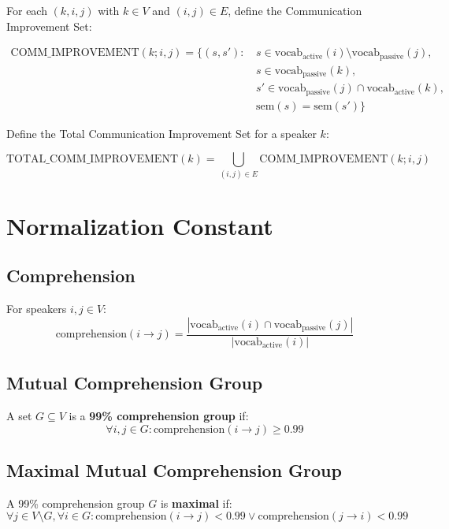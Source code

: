 \documentclass[11pt,a4paper]{article}
\begin{document}
For each $(k,i,j)$ with $k \in V$ and $(i,j) \in E$, define the Communication Improvement Set:

\begin{align}
\text{COMM\_IMPROVEMENT}(k; i,j) = \{(s,s') : &\, s \in \text{vocab}_\text{active}(i) \setminus \text{vocab}_\text{passive}(j),\\
&\, s \in \text{vocab}_\text{passive}(k),\\
&\, s' \in \text{vocab}_\text{passive}(j) \cap \text{vocab}_\text{active}(k),\\
&\, \text{sem}(s) = \text{sem}(s')\}
\end{align}

Define the Total Communication Improvement Set for a speaker $k$:

\begin{equation}
\text{TOTAL\_COMM\_IMPROVEMENT}(k) = \bigcup_{(i,j) \in E} \text{COMM\_IMPROVEMENT}(k; i,j)
\end{equation}

\newpage
\section{Normalization Constant}

\subsection{Comprehension}
For speakers $i, j \in V$:
\begin{equation}
\text{comprehension}(i \to j) = \frac{|\text{vocab}_\text{active}(i) \cap \text{vocab}_\text{passive}(j)|}{|\text{vocab}_\text{active}(i)|}
\end{equation}

\subsection{Mutual Comprehension Group}
A set $G \subseteq V$ is a \textbf{99\% comprehension group} if:
\begin{equation}
\forall i,j \in G: \text{comprehension}(i \to j) \geq 0.99
\end{equation}

\subsection{Maximal Mutual Comprehension Group}
A 99\% comprehension group $G$ is \textbf{maximal} if:
\begin{equation}
\forall j \in V \setminus G, \forall i \in G: \text{comprehension}(i \to j) < 0.99 \vee \text{comprehension}(j \to i) < 0.99
\end{equation}
\end{document}
